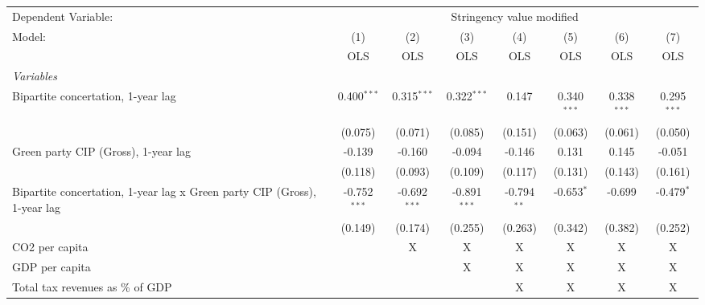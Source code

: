 
\begingroup
\centering
\begin{tabular}{lccccccc}
   \toprule
   Dependent Variable: & \multicolumn{7}{c}{Stringency value modified}\\
   Model:                                                                   & (1)            & (2)            & (3)            & (4)           & (5)           & (6)           & (7)\\  
                                                                            &  OLS           & OLS            & OLS            & OLS           & OLS           & OLS           & OLS\\  
   \midrule
   \emph{Variables}\\
   Bipartite concertation, 1-year lag                                       & 0.400$^{***}$  & 0.315$^{***}$  & 0.322$^{***}$  & 0.147         & 0.340$^{***}$ & 0.338$^{***}$ & 0.295$^{***}$\\   
                                                                            & (0.075)        & (0.071)        & (0.085)        & (0.151)       & (0.063)       & (0.061)       & (0.050)\\   
   Green party CIP (Gross), 1-year lag                                      & -0.139         & -0.160         & -0.094         & -0.146        & 0.131         & 0.145         & -0.051\\   
                                                                            & (0.118)        & (0.093)        & (0.109)        & (0.117)       & (0.131)       & (0.143)       & (0.161)\\   
   Bipartite concertation, 1-year lag x Green party CIP (Gross), 1-year lag & -0.752$^{***}$ & -0.692$^{***}$ & -0.891$^{***}$ & -0.794$^{**}$ & -0.653$^{*}$  & -0.699        & -0.479$^{*}$\\   
                                                                            & (0.149)        & (0.174)        & (0.255)        & (0.263)       & (0.342)       & (0.382)       & (0.252)\\   
   CO2 per capita                                                           &                & X              & X              & X             & X             & X             & X\\  
   GDP per capita                                                           &                &                & X              & X             & X             & X             & X\\  
   Total tax revenues as \% of GDP                                          &                &                &                & X             & X             & X             & X\\  

\end{tabular}
